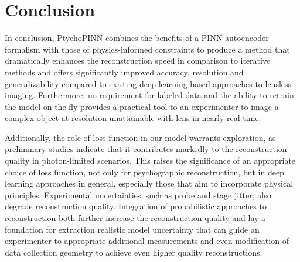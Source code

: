 \documentclass[sn-mathphys]{sn-jnl}%
\theoremstyle{thmstyleone}%
\theoremstyle{thmstyletwo}%
\theoremstyle{thmstylethree}%
\begin{document}
\section{Conclusion}
In conclusion, PtychoPINN combines the benefits of a PINN autoencoder formalism with those of physics-informed constraints to produce a method that dramatically enhances the reconstruction speed in comparison to iterative methods and offers significantly improved accuracy, resolution and generalizability compared to existing deep learning-based approaches to lensless imaging.  Furthermore, no requirement for labeled data and the ability to retrain the model on-the-fly provides a practical tool to an experimenter to image a complex object at resolution unattainable with lens in nearly real-time. 

 Additionally, the role of loss function in our model warrants exploration, as preliminary studies indicate that it contributes markedly to the reconstruction quality in photon-limited scenarios. This raises the significance of an appropriate choice of loss function, not only for psychographic reconstruction, but in deep learning approaches in general, especially those that aim to incorporate physical principles. Experimental uncertainties, such as probe and stage jitter, also degrade reconstruction quality. Integration of probabilistic approaches to reconstruction both further increase the reconstruction quality and lay a foundation for extraction realistic model uncertainty that can guide an experimenter to appropriate additional measurements and even modification of data collection geometry to achieve even higher quality reconstructions.  




\end{document}

